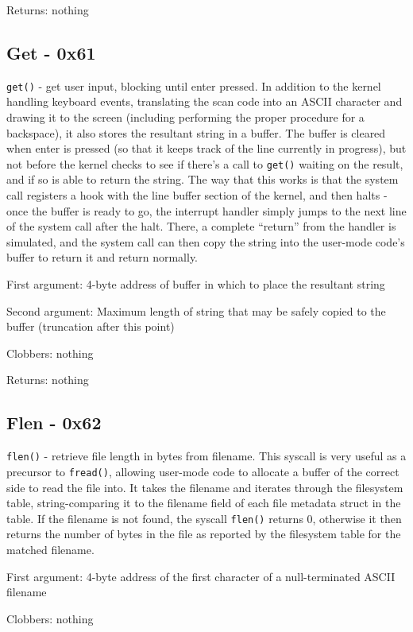 \documentclass[12pt,a4paper]{report}
\begin{document}
Returns: nothing

\subsection*{Get - 0x61}
\texttt{get()} - get user input, blocking until enter pressed. In addition to the kernel handling keyboard events, translating the scan code into an ASCII character and drawing it to the screen (including performing the proper procedure for a backspace), it also stores the resultant string in a buffer. The buffer is cleared when enter is pressed (so that it keeps track of the line currently in progress), but not before the kernel checks to see if there's a call to \texttt{get()} waiting on the result, and if so is able to return the string. The way that this works is that the system call registers a hook with the line buffer section of the kernel, and then halts - once the buffer is ready to go, the interrupt handler simply jumps to the next line of the system call after the halt. There, a complete ``return'' from the handler is simulated, and the system call can then copy the string into the user-mode code's buffer to return it and return normally.

First argument: 4-byte address of buffer in which to place the resultant string

Second argument: Maximum length of string that may be safely copied to the buffer (truncation after this point)

Clobbers: nothing

Returns: nothing

\subsection*{Flen - 0x62}
\texttt{flen()} - retrieve file length in bytes from filename. This syscall is very useful as a precursor to \texttt{fread()}, allowing user-mode code to allocate a buffer of the correct side to read the file into. It takes the filename and iterates through the filesystem table, string-comparing it to the filename field of each file metadata struct in the table. If the filename is not found, the syscall \texttt{flen()} returns 0, otherwise it then returns the number of bytes in the file as reported by the filesystem table for the matched filename.

First argument: 4-byte address of the first character of a null-terminated ASCII filename

Clobbers: nothing
\end{document}
